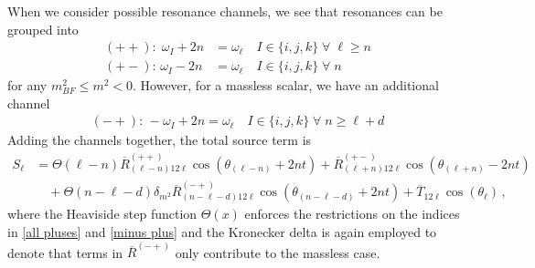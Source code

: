 \documentclass[letterpaper,11pt]{article}
\begin{document}
When we consider possible resonance channels, we see that resonances can be grouped into
\begin{align}
\label{all pluses}
(++): \; \omega_I + 2n &= \omega_\ell \quad I \in \{i,j,k\} \; \forall \; \ell \geq n \\
(+-): \, \omega_I - 2n &=\omega_\ell \quad I \in \{i,j,k\} \; \forall \; n
\end{align}
for any $m^2_{BF} \leq m^2 < 0$. However, for a massless scalar, we have an additional channel
\begin{align}
\label{minus plus}
(-+): \, -\omega_I + 2n = \omega_\ell \quad I \in \{i,j,k\} \; \forall \; n \geq \ell + d
\end{align}
Adding the channels together, the total source term is
\begin{align}
\label{add to integer}
S_\ell &=\Theta \left( \ell - n \right)  \overline{R}^{(++)}_{(\ell - n) 1 2 \ell} \cos \left( \theta_{(\ell - n)} + 2nt \right) + \overline{R}^{(+-)}_{(\ell + n) 1 2 \ell } \cos\left( \theta_{(\ell + n)} - 2nt \right) \nonumber \\
%
& \quad + \Theta\left( n - \ell - d \right) \delta_{m^2} \overline{R}^{(-+)}_{(n - \ell - d) 1 2 \ell} \cos \left( \theta_{(n - \ell - d)} + 2nt \right) + \overline{T}_{12\ell} \cos \left( \theta_\ell \right) \, ,
\end{align}
where the Heaviside step function $\Theta(x)$ enforces the restrictions on the indices in \eqref{all pluses} and \eqref{minus plus} and the Kronecker delta is again employed to denote that terms in $\overline{R}^{(-+)}$ only contribute to the massless case.
\end{document}

